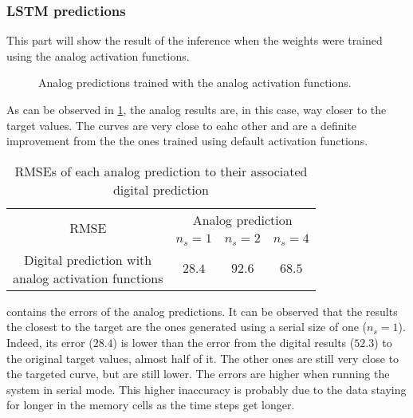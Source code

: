 \subsubsection{\ac{LSTM} predictions}

This part will show the result of the inference when the weights were trained using the analog activation functions.

\begin{figure}[H]
  \centering
  
  \caption{Analog predictions trained with the analog activation functions.}
  \label{graph:airlineAnalog}
\end{figure}

As can be observed in \cref{graph:airlineAnalog}, the analog results are, in this case, way closer to the target values. The curves are very close to eahc other and are a definite improvement from the the ones trained using default activation functions.

\begin{table}[H]
  \centering
  \begin{tabular}{|c|c|c|c|}
    \hline
    \multirow{2}{*}{\acs{RMSE}} & \multicolumn{3}{|c|}{Analog prediction}\\
    \cline{2-4}
    & $n_s=1$ & $n_s=2$ & $n_s=4$ \\
    \hline
    \specialcell{Digital prediction with\\analog activation functions} & $28.4$ & $92.6$ & $68.5$\\
    \hline
  \end{tabular}
  \caption{\acp{RMSE} of each analog prediction to their associated digital prediction}
  \label{tab:airlineAnalog}
\end{table}

 contains the errors of the analog predictions. It can be observed that the results the closest to the target are the ones generated using a serial size of one ($n_s=1$). Indeed, its error ($28.4$) is lower than the error from the digital results ($52.3$) to the original target values, almost half of it. The other ones are still very close to the targeted curve, but are still lower. The errors are higher when running the system in serial mode. This higher inaccuracy is probably due to the data staying for longer in the memory cells as the time steps get longer.


